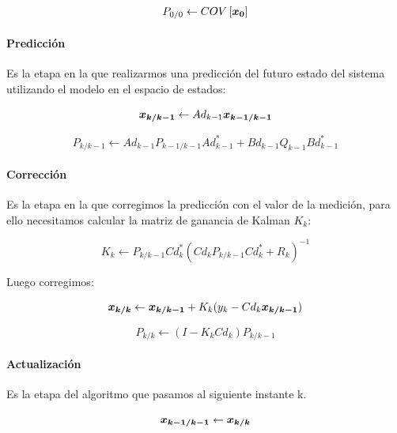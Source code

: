 				\begin{equation*}
					P_{0/0} \leftarrow COV\left[\boldsymbol{x_{0}}\right]
				\end{equation*}
			\paragraph{Predicción}
				Es la etapa en la que realizarmos una predicción del futuro estado del sistema utilizando el modelo en el espacio de estados:
				
				\begin{equation*}
					\boldsymbol{x_{k/k - 1}} \leftarrow Ad_{k - 1} \boldsymbol{x_{k - 1/k - 1}}
				\end{equation*}
				
				\begin{equation*}
					P_{k/k - 1} \leftarrow Ad_{k - 1} P_{k - 1 / k - 1} Ad_{k - 1}^{*} + Bd_{k - 1} Q_{k - 1} Bd_{k - 1}^{*}
				\end{equation*}
			\paragraph{Corrección}
				Es la etapa en la que corregimos la predicción con el valor de la medición, para ello necesitamos calcular la matriz de ganancia de Kalman $K_{k}$:
				
				\begin{equation*}
					K_{k} \leftarrow P_{k / k - 1} Cd_{k}^{*} (Cd_{k} P_{k/k - 1} Cd_{k}^{*} + R_{k})^{-1}
				\end{equation*}
				
				Luego corregimos:
				
				\begin{equation*}
					\boldsymbol{x_{k/k}} \leftarrow \boldsymbol{x_{k/k - 1}} + K_{k} (y_{k} - Cd_{k} \boldsymbol{x_{k/k - 1}})
				\end{equation*}
				
				\begin{equation*}
					P_{k/k} \leftarrow (I - K_{k} Cd_{k}) P_{k/k - 1}
				\end{equation*}
					
			\paragraph{Actualización}
				Es la etapa del algoritmo que pasamos al siguiente instante k.
				
				\begin{equation*}
					\boldsymbol{x_{k - 1/k - 1}} \leftarrow \boldsymbol{x_{k/k}}
				\end{equation*}
				
